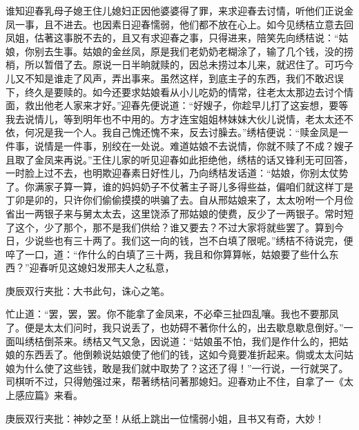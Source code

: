 \begin{parag}
    谁知迎春乳母子媳王住儿媳妇正因他婆婆得了罪，来求迎春去讨情，听他们正说金凤一事，且不进去。也因素日迎春懦弱，他们都不放在心上。如今见绣桔立意去回凤姐，估著这事脱不去的，且又有求迎春之事，只得进来，陪笑先向绣桔说：“姑娘，你别去生事。姑娘的金丝凤，原是我们老奶奶老糊涂了，输了几个钱，没的捞梢，所以暂借了去。原说一日半晌就赎的，因总未捞过本儿来，就迟住了。可巧今儿又不知是谁走了风声，弄出事来。虽然这样，到底主子的东西，我们不敢迟误下，终久是要赎的。如今还要求姑娘看从小儿吃奶的情常，往老太太那边去讨个情面，救出他老人家来才好。”迎春先便说道：“好嫂子，你趁早儿打了这妄想，要等我去说情儿，等到明年也不中用的。方才连宝姐姐林妹妹大伙儿说情，老太太还不依，何况是我一个人。我自己愧还愧不来，反去讨臊去。”绣桔便说：“赎金凤是一件事，说情是一件事，别绞在一处说。难道姑娘不去说情，你就不赎了不成？嫂子且取了金凤来再说。”王住儿家的听见迎春如此拒绝他，绣桔的话又锋利无可回答，一时脸上过不去，也明欺迎春素日好性儿，乃向绣桔发话道：“姑娘，你别太仗势了。你满家子算一算，谁的妈妈奶子不仗著主子哥儿多得些益，偏咱们就这样丁是丁卯是卯的，只许你们偷偷摸摸的哄骗了去。自从邢姑娘来了，太太吩咐一个月俭省出一两银子来与舅太太去，这里饶添了邢姑娘的使费，反少了一两银子。常时短了这个，少了那个，那不是我们供给？谁又要去？不过大家将就些罢了。算到今日，少说些也有三十两了。我们这一向的钱，岂不白填了限呢。”绣桔不待说完，便啐了一口，道：“作什么的白填了三十两，我且和你算算帐，姑娘要了些什么东西？”迎春听见这媳妇发邢夫人之私意，\begin{note}庚辰双行夹批：大书此句，诛心之笔。\end{note}忙止道：“罢，罢，罢。你不能拿了金凤来，不必牵三扯四乱嚷。我也不要那凤了。便是太太们问时，我只说丢了，也妨碍不著你什么的，出去歇息歇息倒好。”一面叫绣桔倒茶来。绣桔又气又急，因说道：“姑娘虽不怕，我们是作什么的，把姑娘的东西丢了。他倒赖说姑娘使了他们的钱，这如今竟要准折起来。倘或太太问姑娘为什么使了这些钱，敢是我们就中取势了？这还了得！”一行说，一行就哭了。司棋听不过，只得勉强过来，帮著绣桔问著那媳妇。迎春劝止不住，自拿了一《太上感应篇》来看。\begin{note}庚辰双行夹批：神妙之至！从纸上跳出一位懦弱小姐，且书又有奇，大妙！\end{note}
\end{parag}


